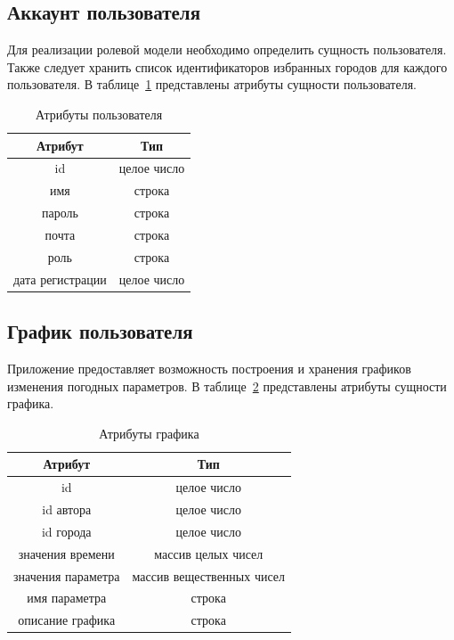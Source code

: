 \subsection*{Аккаунт пользователя}
Для реализации ролевой модели необходимо определить сущность пользователя.
Также следует хранить список идентификаторов избранных городов для каждого пользователя.
В таблице~\ref{table:user_attr} представлены атрибуты сущности пользователя.

\begin{table}[h!]
    \centering
    \begin{tabular}{ |c|c| }
        \hline
            \textbf{Атрибут} & \textbf{Тип} \\
        \hline
            id & целое число \\
        \hline
            имя & строка \\
        \hline
            пароль & строка \\
        \hline
            почта & строка \\
        \hline
            роль & строка \\
        \hline
            дата регистрации & целое число \\
        \hline
            
    \end{tabular}
    \caption{\centering Атрибуты пользователя}
    \label{table:user_attr}
\end{table}

\subsection*{График пользователя}
Приложение предоставляет возможность построения и хранения графиков изменения погодных параметров.
В таблице~\ref{table:plot_attr} представлены атрибуты сущности графика.

\begin{table}[h!]
    \centering
    \begin{tabular}{ |c|c| }
        \hline
            \textbf{Атрибут} & \textbf{Тип} \\
        \hline
            id & целое число \\
        \hline
            id автора & целое число \\
        \hline
            id города & целое число \\
        \hline
            значения времени & массив целых чисел \\
        \hline
            значения параметра & массив вещественных чисел \\
        \hline
            имя параметра & строка \\
        \hline
            описание графика & строка \\
        \hline
            
    \end{tabular}
    \caption{\centering Атрибуты графика}
    \label{table:plot_attr}
\end{table}

